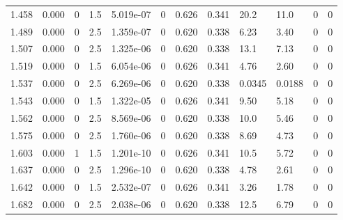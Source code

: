 \documentclass[preview]{standalone}
\begin{document}
{{{\begin{tabular}{L{1.2cm}C{1.2cm} C{0.3cm}C{0.5cm} C{1.4cm}C{1.4cm} C{1.4cm}C{1.4cm} C{1.6cm}C{1.6cm} C{1.6cm}C{1.6cm}}
  1.458  &  0.000  & 0     & 1.5 &  5.019e-07  & 0  &  0.626&   0.341& 20.2 & 11.0   &  0 & 0  \\ 
  1.489  &  0.000  & 0     & 2.5 &  1.359e-07  & 0  &  0.620&   0.338& 6.23 & 3.40   &  0 & 0  \\ 
  1.507  &  0.000  & 0     & 2.5 &  1.325e-06  & 0  &  0.620&   0.338& 13.1 & 7.13   &  0 & 0  \\ 
  1.519  &  0.000  & 0     & 1.5 &  6.054e-06  & 0  &  0.626&   0.341& 4.76 & 2.60   &  0 & 0  \\ 
  1.537  &  0.000  & 0     & 2.5 &  6.269e-06  & 0  &  0.620&   0.338& 0.0345 & 0.0188   &  0 & 0  \\ 
  1.543  &  0.000  & 0     & 1.5 &  1.322e-05  & 0  &  0.626&   0.341& 9.50 & 5.18   &  0 & 0  \\ 
  1.562  &  0.000  & 0     & 2.5 &  8.569e-06  & 0  &  0.620&   0.338& 10.0 & 5.46   &  0 & 0  \\ 
  1.575  &  0.000  & 0     & 2.5 &  1.760e-06  & 0  &  0.620&   0.338& 8.69 & 4.73   &  0 & 0  \\ 
  1.603  &  0.000  & 1     & 1.5 &  1.201e-10  & 0  &  0.626&   0.341& 10.5 & 5.72   &  0 & 0  \\ 
  1.637  &  0.000  & 0     & 2.5 &  1.296e-10  & 0  &  0.620&   0.338& 4.78 & 2.61   &  0 & 0  \\ 
  1.642  &  0.000  & 0     & 1.5 &  2.532e-07  & 0  &  0.626&   0.341& 3.26 & 1.78   &  0 & 0  \\ 
  1.682  &  0.000  & 0     & 2.5 &  2.038e-06  & 0  &  0.620&   0.338& 12.5 & 6.79   &  0 & 0  \\ 
\hline 
\end{tabular} 

}}}
\end{document}
